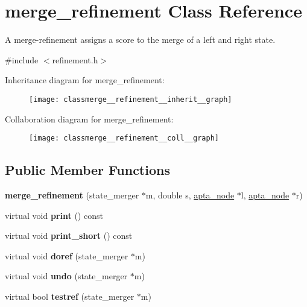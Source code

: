 \hypertarget{classmerge__refinement}{}\section{merge\+\_\+refinement Class Reference}
\label{classmerge__refinement}


A merge-\/refinement assigns a score to the merge of a left and right state.  




{\ttfamily \#include $<$refinement.\+h$>$}



Inheritance diagram for merge\+\_\+refinement\+:
\nopagebreak
\begin{figure}[H]
\begin{center}
\leavevmode
\texttt{[image: classmerge\_\_refinement\_\_inherit\_\_graph]}
\end{center}
\end{figure}


Collaboration diagram for merge\+\_\+refinement\+:
\nopagebreak
\begin{figure}[H]
\begin{center}
\leavevmode
\texttt{[image: classmerge\_\_refinement\_\_coll\_\_graph]}
\end{center}
\end{figure}
\subsection*{Public Member Functions}
\begin{DoxyCompactItemize}
\item 
\mbox{\label{classmerge__refinement_a4623af919a6ad5c95c592cb6b448d209}} 
{\bfseries merge\+\_\+refinement} (state\+\_\+merger $\ast$m, double s, \hyperlink{classapta__node}{apta\+\_\+node} $\ast$l, \hyperlink{classapta__node}{apta\+\_\+node} $\ast$r)
\item 
\mbox{\label{classmerge__refinement_a88369d77cd09ba18d453a845311ba52b}} 
virtual void {\bfseries print} () const
\item 
\mbox{\label{classmerge__refinement_ad0fc6a061a0ff0d91c4e4c869194f0ac}} 
virtual void {\bfseries print\+\_\+short} () const
\item 
\mbox{\label{classmerge__refinement_ad1b3a5fe3fa980978d909debf4eaebd1}} 
virtual void {\bfseries doref} (state\+\_\+merger $\ast$m)
\item 
\mbox{\label{classmerge__refinement_ae5d7dcbd7ddc8595b2d7bcf88d14ad98}} 
virtual void {\bfseries undo} (state\+\_\+merger $\ast$m)
\item 
\mbox{\label{classmerge__refinement_aa9f4507d2a3de285a52546be3be2ba40}} 
virtual bool {\bfseries testref} (state\+\_\+merger $\ast$m)
\end{DoxyCompactItemize}
